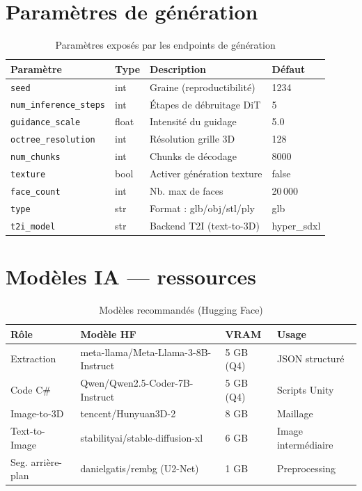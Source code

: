 \documentclass[12pt,a4paper,oneside]{report}
\begin{document}
\chapter{Paramètres de génération}
\label{ann:params}

\begin{table}[H]
\centering
\caption{Paramètres exposés par les endpoints de génération}
\begin{tabularx}{\linewidth}{@{}llXl@{}}
\toprule
\textbf{Paramètre} & \textbf{Type} & \textbf{Description} & \textbf{Défaut} \\\midrule
\texttt{seed}                  & int   & Graine (reproductibilité) & 1234 \\
\texttt{num\_inference\_steps} & int   & Étapes de débruitage DiT  & 5 \\
\texttt{guidance\_scale}       & float & Intensité du guidage      & 5.0 \\
\texttt{octree\_resolution}    & int   & Résolution grille 3D      & 128 \\
\texttt{num\_chunks}           & int   & Chunks de décodage        & 8000 \\
\texttt{texture}               & bool  & Activer génération texture& false \\
\texttt{face\_count}           & int   & Nb. max de faces          & 20\,000 \\
\texttt{type}                  & str   & Format : glb/obj/stl/ply  & glb \\
\texttt{t2i\_model}            & str   & Backend T2I (text-to-3D)  & hyper\_sdxl \\
\bottomrule
\end{tabularx}
\end{table}

\chapter{Modèles IA — ressources}
\label{ann:models}

\begin{table}[H]
\centering
\caption{Modèles recommandés (Hugging Face)}
\begin{tabularx}{\linewidth}{@{}lXll@{}}
\toprule
\textbf{Rôle} & \textbf{Modèle HF} & \textbf{VRAM} & \textbf{Usage} \\\midrule
Extraction     & meta-llama/Meta-Llama-3-8B-Instruct & 5 GB (Q4) & JSON structuré \\
Code C\#       & Qwen/Qwen2.5-Coder-7B-Instruct      & 5 GB (Q4) & Scripts Unity \\
Image-to-3D   & tencent/Hunyuan3D-2                 & 8 GB & Maillage \\
Text-to-Image  & stabilityai/stable-diffusion-xl     & 6 GB & Image intermédiaire \\
Seg. arrière-plan & danielgatis/rembg (U2-Net)      & 1 GB & Preprocessing \\
\bottomrule
\end{tabularx}
\end{table}
\end{document}
